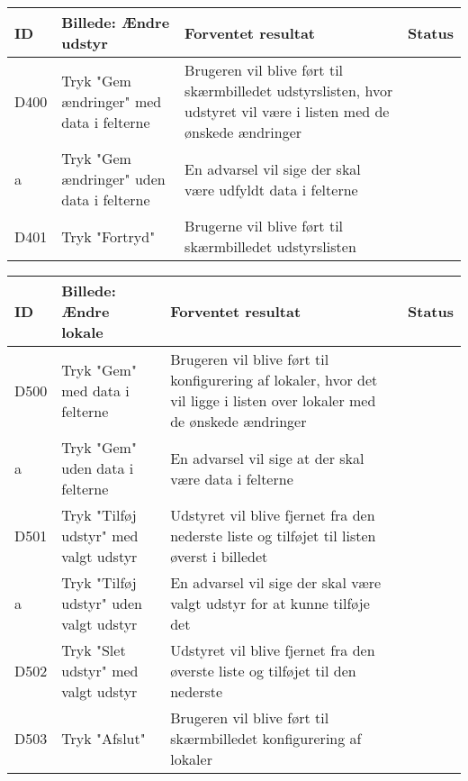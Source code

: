 \begin{tabularx}{\textwidth}{ |X|X|X|X| }
\hline
	ID & Billede: Ændre udstyr & Forventet resultat & Status\\ 
\hline
	D400 & Tryk "Gem ændringer" med data i felterne & Brugeren vil blive ført til skærmbilledet udstyrslisten, hvor udstyret vil være i listen med de ønskede ændringer & \\
\hline
	a & Tryk "Gem ændringer" uden data i felterne & En advarsel vil sige der skal være udfyldt data i felterne & \\
\hline
	D401 & Tryk "Fortryd" & Brugerne vil blive ført til skærmbilledet udstyrslisten & \\
\hline
\end{tabularx}

\begin{tabularx}{\textwidth}{ |X|X|X|X| }
\hline
	ID & Billede: Ændre lokale  & Forventet resultat & Status\\ 
\hline
	D500 & Tryk "Gem" med data i felterne & Brugeren vil blive ført til konfigurering af lokaler, hvor det vil ligge i listen over lokaler med de ønskede ændringer  & \\
\hline
	a & Tryk "Gem" uden data i felterne & En advarsel vil sige at der skal være data i felterne & \\
\hline
	D501 & Tryk "Tilføj udstyr" med valgt udstyr & Udstyret vil blive fjernet fra den nederste liste og tilføjet til listen øverst i billedet & \\
\hline
	a & Tryk "Tilføj udstyr" uden valgt udstyr & En advarsel vil sige der skal være valgt udstyr for at kunne tilføje det & \\
\hline
	D502 & Tryk "Slet udstyr" med valgt udstyr & Udstyret vil blive fjernet fra den øverste liste og tilføjet til den nederste  & \\
\hline
	D503 & Tryk "Afslut" & Brugeren vil blive ført til skærmbilledet konfigurering af lokaler & \\
\hline
\end{tabularx}

